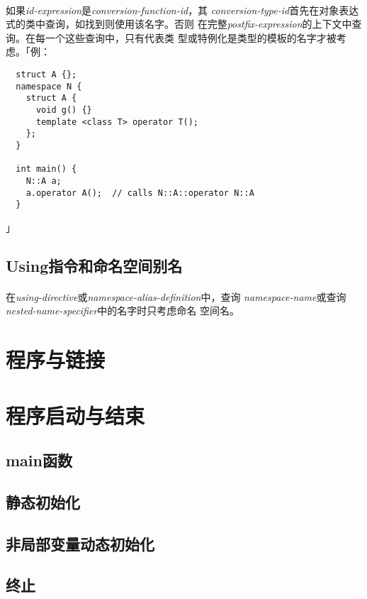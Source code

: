 \paragraph{}
如果\textit{id-expression}是\textit{conversion-function-id}，其
\textit{conversion-type-id}首先在对象表达式的类中查询，如找到则使用该名字。否则
在完整\textit{postfix-expression}的上下文中查询。在每一个这些查询中，只有代表类
型或特例化是类型的模板的名字才被考虑。「例：
\begin{lstlisting}
  struct A {};
  namespace N {
    struct A {
      void g() {}
      template <class T> operator T();
    };
  }

  int main() {
    N::A a;
    a.operator A();  // calls N::A::operator N::A
  }
\end{lstlisting}」

\subsection{Using指令和命名空间别名}
\paragraph{}
在\textit{using-directive}或\textit{namespace-alias-definition}中，查询
\textit{namespace-name}或查询\textit{nested-name-specifier}中的名字时只考虑命名
空间名。

\section{程序与链接}

\section{程序启动与结束}
\subsection{main函数}
\subsection{静态初始化}
\subsection{非局部变量动态初始化}
\subsection{终止}

